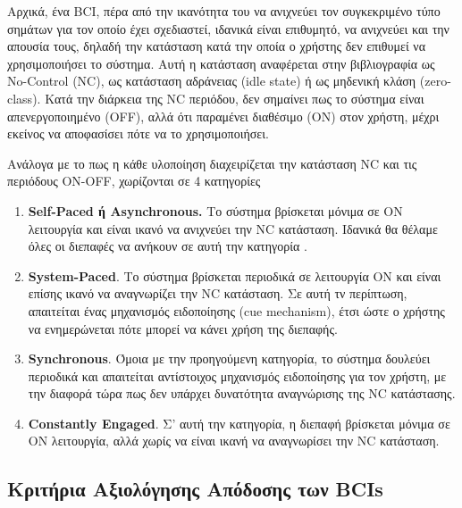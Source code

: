 \documentclass[11pt,a4paper,english,greek,twoside]{../Thesis}
\begin{document}
\par Αρχικά, ένα BCI, πέρα από την ικανότητα του να ανιχνεύει τον συγκεκριμένο τύπο σημάτων για τον οποίο έχει σχεδιαστεί, ιδανικά είναι επιθυμητό, να ανιχνεύει και την απουσία τους, δηλαδή την κατάσταση κατά την οποία ο χρήστης δεν επιθυμεί να χρησιμοποιήσει το σύστημα. Αυτή η κατάσταση αναφέρεται στην βιβλιογραφία ως No-Control (NC), ως κατάσταση αδράνειας (idle state) ή ως μηδενική κλάση (zero-class). Κατά την διάρκεια της NC περιόδου, δεν σημαίνει πως το σύστημα είναι απενεργοποιημένο (OFF), αλλά ότι παραμένει διαθέσιμο (ON) στον χρήστη, μέχρι εκείνος να αποφασίσει πότε να το χρησιμοποιήσει. 

\par Ανάλογα με το πως η κάθε υλοποίηση διαχειρίζεται την κατάσταση NC και τις περιόδους ON-OFF, χωρίζονται σε 4 κατηγορίες \cite{Mason2006-ts}
\begin{enumerate}
    \item \textbf{Self-Paced ή Asynchronous.} Το σύστημα βρίσκεται μόνιμα σε ON λειτουργία και είναι ικανό να ανιχνεύει την NC κατάσταση. Ιδανικά θα θέλαμε όλες οι διεπαφές να ανήκουν σε αυτή την κατηγορία \cite{Muller-Putz2006-wj}. 
    \label{item:asynchronous}
    \item \textbf{System-Paced}. Το σύστημα βρίσκεται περιοδικά σε λειτουργία ON και είναι επίσης ικανό να αναγνωρίζει την NC κατάσταση. Σε αυτή τν περίπτωση, απαιτείται ένας μηχανισμός ειδοποίησης (cue mechanism), έτσι ώστε ο χρήστης να ενημερώνεται πότε μπορεί να κάνει χρήση της διεπαφής.
    \item \textbf{Synchronous}. Όμοια με την προηγούμενη κατηγορία, το σύστημα δουλεύει περιοδικά και απαιτείται αντίστοιχος μηχανισμός ειδοποίησης για τον χρήστη, με την διαφορά τώρα πως δεν υπάρχει δυνατότητα αναγνώρισης της NC κατάστασης.
    \item \textbf{Constantly Engaged}. Σ' αυτή την κατηγορία, η διεπαφή βρίσκεται μόνιμα σε ON λειτουργία, αλλά χωρίς να είναι ικανή να αναγνωρίσει την NC κατάσταση.
\end{enumerate}

  \subsection{Κριτήρια Αξιολόγησης Απόδοσης των BCIs}
  
\end{document}
